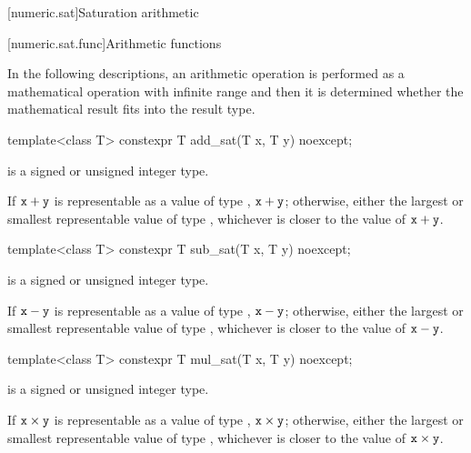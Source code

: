 [numeric.sat]{Saturation arithmetic}

[numeric.sat.func]{Arithmetic functions}

\pnum
In the following descriptions, an arithmetic operation
is performed as a mathematical operation with infinite range and then
it is determined whether the mathematical result fits into the result type.

%
\begin{itemdecl}
template<class T>
  constexpr T add_sat(T x, T y) noexcept;
\end{itemdecl}

\begin{itemdescr}
\pnum
\constraints
{} is a signed or unsigned integer type.

\pnum
\returns
If $\tcode{x} + \tcode{y}$ is representable as a value of type , $\tcode{x} + \tcode{y}$;
otherwise, either the largest or smallest representable value of type ,
whichever is closer to the value of $\tcode{x} + \tcode{y}$.
\end{itemdescr}

%
\begin{itemdecl}
template<class T>
  constexpr T sub_sat(T x, T y) noexcept;
\end{itemdecl}

\begin{itemdescr}
\pnum
\constraints
{} is a signed or unsigned integer type.

\pnum
\returns
If $\tcode{x} - \tcode{y}$ is representable as a value of type , $\tcode{x} - \tcode{y}$;
otherwise, either the largest or smallest representable value of type ,
whichever is closer to the value of $\tcode{x} - \tcode{y}$.
\end{itemdescr}

%
\begin{itemdecl}
template<class T>
  constexpr T mul_sat(T x, T y) noexcept;
\end{itemdecl}

\begin{itemdescr}
\pnum
\constraints
{} is a signed or unsigned integer type.

\pnum
\returns
If $\tcode{x} \times \tcode{y}$ is representable as a value of type , $\tcode{x} \times \tcode{y}$;
otherwise, either the largest or smallest representable value of type ,
whichever is closer to the value of $\tcode{x} \times \tcode{y}$.
\end{itemdescr}

